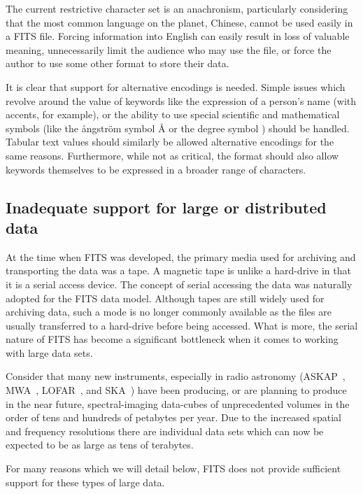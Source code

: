 \documentclass[final,authoryear,5p,times,twocolumn]{elsarticle}
\begin{document}
{{The current restrictive character set is an
anachronism, particularly considering that the most common language on the planet,
Chinese, cannot be used easily in a FITS file. Forcing information
into English can easily result in loss of valuable meaning, unnecessarily
limit the audience who may use the file, or force the author to use some other
format to store their data.


It is clear that support for alternative encodings is needed.
Simple issues which revolve around the value of keywords like the
expression of a person's name (with accents, for example), or the
ability to use special scientific and mathematical symbols (like the
\r{a}ngstr\"{o}m symbol \r{A} or the degree symbol \degree) should be
handled. Tabular text values should similarly be allowed alternative
encodings for the same reasons.  Furthermore, while not as critical, the
format should also allow keywords themselves to be expressed in a broader
range of characters.


\subsection{Inadequate support for large or distributed data}
\label{section_poor_large_data_support}

At the time when FITS was developed, the primary media used for
archiving and transporting the data was a tape. A magnetic tape is
unlike a hard-drive in that it is a serial access device.  The concept
of serial accessing the data was naturally adopted for the FITS data
model.  Although tapes are still widely used for archiving data,
such a mode is no longer commonly available as the files are usually
transferred to a hard-drive before being accessed. What is more, the
serial nature of FITS has become a significant bottleneck when it comes
to working with large data sets.


Consider that many new instruments, especially in radio astronomy 
(ASKAP~\citep{ASKAP..09},
MWA~\citep{TINGAY}, LOFAR~\citep{2013A&A...556A...2V}, and SKA~\citep{ska-exascale})
have been producing, or are planning to produce in the near future, 
spectral-imaging data-cubes of unprecedented volumes in the order of
tens and hundreds of petabytes per year. Due to the increased spatial and frequency
resolutions there are individual data sets which can now be expected to be as 
large as tens of terabytes.


For many reasons which we will detail below, FITS does not provide sufficient
support for these types of large data.

}}
\end{document}
